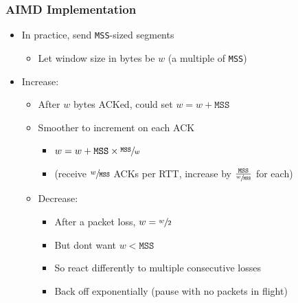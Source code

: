 \subsubsection{AIMD Implementation}
\begin{itemize}[nosep]
    \item In practice, send \texttt{MSS}-sized segments
          \begin{itemize}[nosep]
              \item Let window size in bytes be $w$ (a multiple of \texttt{MSS})
          \end{itemize}
    \item Increase:
          \begin{itemize}[nosep]
              \item After $w$ bytes ACKed, could set $w = w + \texttt{MSS}$
              \item Smoother to increment on each ACK
                    \begin{itemize}[nosep]
                        \item $w = w + \texttt{MSS} \times \sfrac{\texttt{MSS}}{w}$
                        \item (receive $\sfrac{w}{\texttt{MSS}}$ ACKs per RTT, increase by $\frac{\texttt{MSS}}{\sfrac{w}{\texttt{MSS}}}$ for each)
                    \end{itemize}
              \item Decrease:
                    \begin{itemize}[nosep]
                        \item After a packet loss, $w = \sfrac{w}{2}$
                        \item But dont want $w < \texttt{MSS}$
                        \item So react differently to multiple consecutive losses
                        \item Back off exponentially (pause with no packets in flight)
                    \end{itemize}
          \end{itemize}
\end{itemize}

